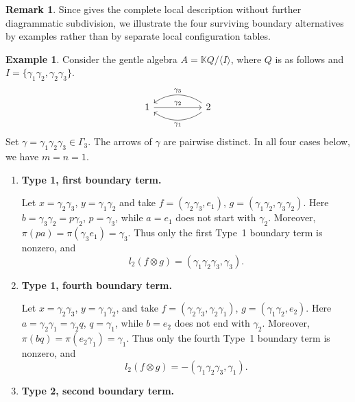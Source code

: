 \documentclass[11pt,a4paper,reqno]{amsart}
\newcommand{\mK}{\mathbb K}
\newcommand{\para}[2]{(#1,#2)}
\theoremstyle{plain}
\theoremstyle{definition}
\newtheorem{example}[example]{Example}
\newtheorem{remark}[remark]{Remark}
\numberwithin{equation}{section}
\begin{document}
	\begin{remark}
		Since  gives the complete local description without
		further diagrammatic subdivision, we illustrate the four surviving
		boundary alternatives by examples rather than by separate local
		configuration tables.
	\end{remark}
	\begin{example}
		\label{ex:higher-no-repetition-four-types}
		Consider the gentle algebra
		$A=\mK Q/\langle I\rangle$,
		where $Q$ is as follows and
		$I=\{\gamma_1\gamma_2, \gamma_2\gamma_3\}$.
		\[
		\begin{tikzcd}[column sep=5em]
			1
			\arrow[r,"\gamma_2"]
			&
			2
			\arrow[l,bend left=35,"\gamma_1"]
			\arrow[l,bend right=35,swap,"\gamma_3"]
		\end{tikzcd}
		\]
		Set
		$\gamma=\gamma_1\gamma_2\gamma_3\in\Gamma_3$.
		The arrows of $\gamma$ are pairwise distinct.  In all four cases below, we have $m=n=1$.
		
		\begin{enumerate}
			\item[(1)] \textbf{Type 1, first boundary term.}
			
			Let
			$x=\gamma_2\gamma_3$, $y=\gamma_1\gamma_2$
			and take
			$f=\para{\gamma_2\gamma_3}{e_1}$, $g=\para{\gamma_1\gamma_2}{\gamma_3\gamma_2}$.
			Here
			$b=\gamma_3\gamma_2=p\gamma_2$, $p=\gamma_3$,
			while $a=e_1$ does not start with $\gamma_2$.  Moreover,
			$\pi(pa)=\pi(\gamma_3e_1)=\gamma_3$.
			Thus only the first Type~1 boundary term is nonzero, and
			\[
			l_2(f\otimes g)
			=
			\para{\gamma_1\gamma_2\gamma_3}{\gamma_3}.
			\]
			
			\item[(2)] \textbf{Type 1, fourth boundary term.}
			
			Let
			$x=\gamma_2\gamma_3$, $y=\gamma_1\gamma_2$,
			and take
			$f=\para{\gamma_2\gamma_3}{\gamma_2\gamma_1}$, $g=\para{\gamma_1\gamma_2}{e_2}$.
			Here
			$a=\gamma_2\gamma_1=\gamma_2q$, $q=\gamma_1$,
			while $b=e_2$ does not end with $\gamma_2$.  Moreover,
			$\pi(bq)=\pi(e_2\gamma_1)=\gamma_1$.
			Thus only the fourth Type~1 boundary term is nonzero, and
			\[
			l_2(f\otimes g)
			=
			-\para{\gamma_1\gamma_2\gamma_3}{\gamma_1}.
			\]
			
			\item[(3)] \textbf{Type 2, second boundary term.}
			

\end{enumerate}
\end{example}
\end{document}
